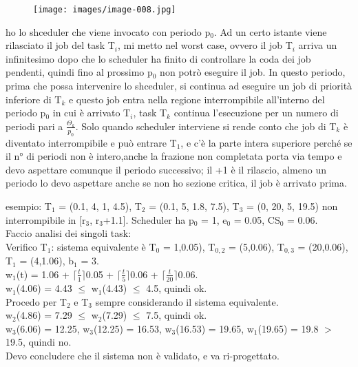 \documentclass[12pt, oneside]{extbook}
\begin{document}
\begin{itemize}
\begin{figure}[!h]
\centering
\texttt{[image: images/image-008.jpg]}
\end{figure}
ho lo shceduler che viene invocato con periodo p$_{0}$. Ad un certo istante viene rilasciato il job del task T$_{i}$, mi metto nel worst case, ovvero il job T$_{i}$ arriva un infinitesimo dopo che lo scheduler ha finito di controllare la coda dei job pendenti, quindi fino al prossimo p$_{0}$ non potrò eseguire il job. In questo periodo, prima che possa intervenire lo shceduler, si continua ad eseguire un job di priorità inferiore di T$_{k}$ e questo job entra nella regione interrompibile all'interno del periodo p$_{0}$ in cui è arrivato T$_{i}$, task T$_{k}$ continua l'esecuzione per un numero di periodi pari a $\frac{\Theta_{k}}{p_{0}}$. Solo quando scheduler interviene si rende conto che job di T$_{k}$ è diventato interrompibile e può entrare T$_{1}$, e c'è la parte intera superiore perché se il n° di periodi non è intero,anche la frazione non completata porta via tempo e devo aspettare comunque il periodo successivo; il +1 è il rilascio, almeno un periodo lo devo aspettare anche se non ho sezione critica, il job è arrivato prima.
\end{itemize}
esempio: T$_{1}$ = (0.1, 4, 1, 4.5), T$_{2}$ = (0.1, 5, 1.8, 7.5), T$_{3}$ = (0, 20, 5, 19.5) non interrompibile in [r$_{3}$, r$_{3}$+1.1]. Scheduler ha p$_{0}$ = 1, e$_{0}$ = 0.05, CS$_{0}$ = 0.06.\\ Faccio analisi dei singoli task:\\
Verifico T$_{1}$: sistema equivalente è T$_{0}$ = 1,0.05), T$_{0,2}$ = (5,0.06), T$_{0,3}$ = (20,0.06), T$_{1}$ = (4,1.06), b$_{1}$ = 3.\\ w$_{1}$(t)
 = 1.06 + $\lceil \frac{t}{1}\rceil$0.05 + $\lceil \frac{t}{5}\rceil$0.06 + $\lceil \frac{t}{20}\rceil$0.06.\\
w$_{1}$(4.06) = 4.43 $\leq$ w$_{1}$(4.43) $\leq$ 4.5, quindi ok.\\
Procedo per T$_{2}$ e T$_{3}$ sempre considerando il sistema equivalente.\\ w$_{2}$(4.86) = 7.29 $\leq$ w$_{2}$(7.29) $\leq$ 7.5, quindi ok.\\
w$_{3}$(6.06) = 12.25,  w$_{3}$(12.25) = 16.53, w$_{3}$(16.53) = 19.65, w$_{1}$(19.65) = 19.8 $>$ 19.5, quindi no.\\ Devo concludere che il sistema non è validato, e va ri-progettato.
\end{document}
